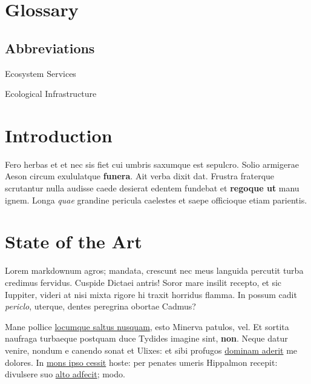 \documentclass[
  a4paper,
  oneside]{ETH-thesis-template}
\providecommand{\tightlist}{%
  \setlength{\itemsep}{0pt}\setlength{\parskip}{0pt}}\usepackage{longtable,booktabs,array}
\begin{document}
\chapter*{Glossary}\label{glossary}


\section*{Abbreviations}\label{abbreviations}


\begin{description}
\tightlist
\item[ES]
Ecosystem Services
\item[EI]
Ecological Infrastructure
\end{description}


\chapter{Introduction}\label{sec-intro_chap}

\setcounter{page}{1}
\renewcommand{\thepage}{\arabic{page}}

\newpage

Fero herbas et et nec sis fiet cui umbris saxumque est sepulcro. Solio
armigerae Aeson circum exululatque \textbf{funera}. Ait verba dixit dat.
Frustra fraterque scrutantur nulla audisse caede desierat edentem
fundebat et \textbf{regoque ut} manu ignem. Longa \emph{quae} grandine
pericula caelestes et saepe officioque etiam parientis.


\chapter{State of the Art}\label{sec-SotA_chap}

\newpage

Lorem markdownum agros; mandata, crescunt nec meus languida percutit
turba credimus fervidus. Cuspide Dictaei antris! Soror mare insilit
recepto, et sic Iuppiter, videri at nisi mixta rigore hi traxit horridus
flamma. In possum cadit \emph{periclo}, uterque, dentes peregrina
obortae Cadmus?

Mane pollice \href{http://www.traxit.com/palamedes.php}{locumque saltus
nusquam}, esto Minerva patulos, vel. Et sortita naufraga turbaeque
postquam duce Tydides imagine sint, \textbf{non}. Neque datur venire,
nondum e canendo sonat et Ulixes: et sibi profugos
\href{http://varas.com/molliforsitan}{dominam aderit} me dolores. In
\href{http://nemus.io/}{mons ipso cessit} hoste: per penates umeris
Hippalmon recepit: divulsere suo
\href{http://exclamatque.net/iter.html}{alto adfecit}; modo.
\end{document}
